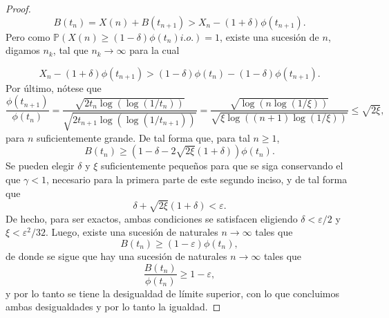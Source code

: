 \documentclass[letterpaper]{article}
\renewcommand{\to}{\rightarrow}
\renewcommand{\P}{\mathbb{P}}
\newcommand{\1}{\mathds{1}}
\theoremstyle{definition}
\theoremstyle{definition}
\theoremstyle{definition}
\theoremstyle{definition}
\theoremstyle{definition}
\begin{document}
\begin{enumerate}
\begin{proof}
      \[
      B(t_n)=X(n)+B(t_{n+1})>X_n-(1+\delta)\phi(t_{n+1}).  
      \]
      Pero como $\P\left(X(n)\geq(1-\delta)\phi(t_n) i.o.\right)=1$, existe una
      sucesión de $n$, digamos $n_k$, tal que $n_k\to \infty$ para la cual

      \[
        X_n-(1+\delta)\phi(t_{n+1})>(1- \delta)\phi(t_n)-(1-\delta)\phi(t_{n+1}).
      \]
      Por último, nótese que
      \[
      \frac{\phi(t_{n+1})}{\phi(t_n)}=\frac{\sqrt{2t_n\log(\log(1/t_n))}}{\sqrt{2t_{n+1}\log(\log(1/t_{n+1}))}}=\frac{\sqrt{\log(n\log(1/\xi))}}{\sqrt{\xi\log((n+1)\log(1/\xi))}}
      \leq \sqrt{2\xi},
      \]
      para $n$ suficientemente grande. De tal forma que, para tal $n\geq1$,
      \[
      B(t_n)\geq(1-\delta-2\sqrt{2\xi}(1+\delta))\phi(t_n).  
      \]
      Se pueden elegir $\delta$ y $\xi$ suficientemente pequeños para que se siga conservando
      el que $\gamma<1$, necesario para la primera parte de este segundo inciso, y 
      de tal forma que
      \[
      \delta+\sqrt{2\xi}(1+\delta)<\varepsilon.  
      \]
      De hecho, para ser exactos, ambas condiciones se satisfacen eligiendo $\delta<\varepsilon/2$ y $\xi<\varepsilon^2/32$.
      Luego, existe una sucesión de naturales $n\to \infty$ tales que
      \[
      B(t_n)\geq(1-\varepsilon)\phi(t_n), 
      \]
      de donde se sigue que hay una sucesión de naturales $n\to \infty$ tales que
      \[
        \frac{B(t_n)}{\phi(t_n)}\geq 1-\varepsilon,
      \]
      y por lo tanto se tiene la desigualdad de límite superior, con lo que
      concluimos ambas desigualdades y por lo tanto la igualdad.


\end{proof}
\end{enumerate}
\end{document}
